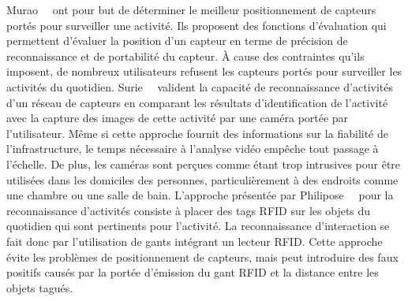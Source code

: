 Murao~\etal~\parencite{murao2013evaluation} ont pour but de déterminer le meilleur 
positionnement de capteurs portés pour surveiller une activité. Ils proposent 
des fonctions d'évaluation qui permettent d'évaluer la position d'un capteur 
en terme de précision de reconnaissance et de portabilité du capteur. À cause
des contraintes qu'ils imposent, de nombreux utilisateurs refusent les capteurs 
portés pour surveiller les activités du quotidien.
Surie~\etal~\parencite{surie2008wireless} valident la capacité de reconnaissance 
d'activités d'un réseau de capteurs en comparant les résultats d'identification 
de l'activité avec la capture des images de cette activité par une caméra portée 
par l'utilisateur. 
Même si cette approche fournit des informations sur la fiabilité de 
l'infrastructure, le temps nécessaire à l'analyse vidéo empêche tout passage à 
l'échelle. De plus, les caméras sont perçues comme étant trop intrusives pour être 
utilisées dans les domiciles des personnes, particulièrement à des endroits comme
une chambre ou une salle de bain. 
L'approche présentée par Philipose~\etal~\parencite{philipose2004infering} pour la 
reconnaissance d'activités consiste à placer des tags RFID sur les objets du 
quotidien qui sont pertinents pour l'activité. La reconnaissance d'interaction se fait 
donc par l'utilisation de gants intégrant un lecteur RFID. Cette approche évite les problèmes de 
positionnement de capteurs, mais peut introduire des faux positifs causés par 
la portée d'émission du gant RFID et la distance entre les objets tagués.

